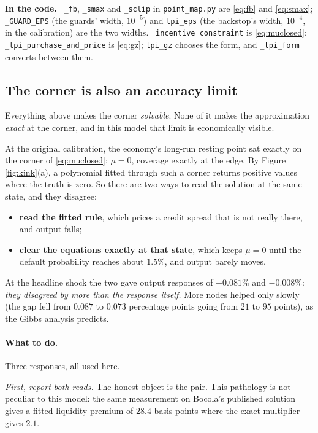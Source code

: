 \documentclass[10pt,a4paper]{article}
\newenvironment{incode}{\begin{leftbar}\small\noindent\textcolor{codecol}{\textbf{In the code.}}\ }{\end{leftbar}}
\theoremstyle{plain}
\theoremstyle{remark}
\newcommand{\file}[1]{\textcolor{codecol}{\texttt{#1}}}
\newcommand{\code}[1]{\texttt{#1}}
\begin{document}
\begin{incode}
\code{\_fb}, \code{\_smax} and \code{\_sclip} in \file{point\_map.py} are \eqref{eq:fb} and
\eqref{eq:smax}; \code{\_GUARD\_EPS} (the guards' width, $10^{-5}$) and \code{tpi\_eps} (the
backstop's width, $10^{-4}$, in the calibration) are the two widths. \code{\_incentive\_constraint}
is \eqref{eq:muclosed}; \code{\_tpi\_purchase\_and\_price} is \eqref{eq:gz}; \code{tpi\_gz} chooses
the form, and \code{\_tpi\_form} converts between them.
\end{incode}

\subsection{The corner is also an accuracy limit}

Everything above makes the corner \emph{solvable}. None of it makes the approximation \emph{exact}
at the corner, and in this model that limit is economically visible.

At the original calibration, the economy's long-run resting point sat exactly on the corner of
\eqref{eq:muclosed}: $\mu=0$, coverage exactly at the edge. By Figure \ref{fig:kink}(a), a polynomial
fitted through such a corner returns positive values where the truth is zero. So there are two ways
to read the solution at the same state, and they disagree:
\begin{itemize}
\item \textbf{read the fitted rule}, which prices a credit spread that is not really there, and
output falls;
\item \textbf{clear the equations exactly at that state}, which keeps $\mu=0$ until the default
probability reaches about $1.5\%$, and output barely moves.
\end{itemize}
At the headline shock the two gave output responses of $-0.081\%$ and $-0.008\%$: \emph{they disagreed
by more than the response itself.} More nodes helped only slowly (the gap fell from $0.087$ to $0.073$
percentage points going from $21$ to $95$ points), as the Gibbs analysis predicts.

\paragraph{What to do.} Three responses, all used here.

\emph{First, report both reads.} The honest object is the pair. This pathology is not peculiar to
this model: the same measurement on Bocola's published solution gives a fitted liquidity premium of
$28.4$ basis points where the exact multiplier gives $2.1$.
\end{document}
